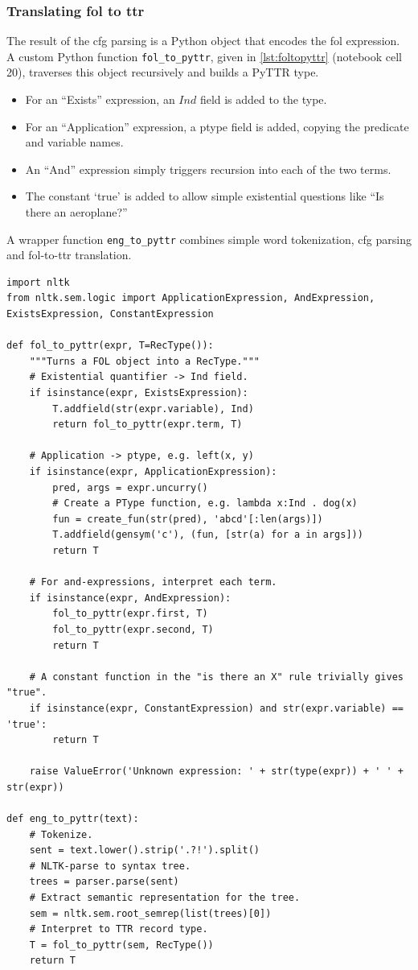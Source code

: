 \subsubsection{Translating \gls{fol} to \gls{ttr}}

The result of the \gls{cfg} parsing is a Python object that encodes the \gls{fol} expression.
A custom Python function \texttt{fol\_to\_pyttr}, given in \autoref{lst:foltopyttr} (notebook cell 20), traverses this object recursively and builds a PyTTR type.

\begin{itemize}
\item For an ``Exists'' expression, an $Ind$ field is added to the type.
\item For an ``Application'' expression, a ptype field is added, copying the predicate and variable names.
\item An ``And'' expression simply triggers recursion into each of the two terms.
\item The constant `true' is added to allow simple existential questions like ``Is there an aeroplane?''
\end{itemize}

A wrapper function \texttt{eng\_to\_pyttr} combines simple word tokenization, \gls{cfg} parsing and \gls{fol}-to-\gls{ttr} translation.

\begin{lstlisting}[label=lst:foltopyttr, caption=Translation from \gls{fol} to \gls{ttr}.]
import nltk
from nltk.sem.logic import ApplicationExpression, AndExpression, ExistsExpression, ConstantExpression

def fol_to_pyttr(expr, T=RecType()):
    """Turns a FOL object into a RecType."""
    # Existential quantifier -> Ind field.
    if isinstance(expr, ExistsExpression):
        T.addfield(str(expr.variable), Ind)
        return fol_to_pyttr(expr.term, T)
    
    # Application -> ptype, e.g. left(x, y)
    if isinstance(expr, ApplicationExpression):
        pred, args = expr.uncurry()
        # Create a PType function, e.g. lambda x:Ind . dog(x)
        fun = create_fun(str(pred), 'abcd'[:len(args)])
        T.addfield(gensym('c'), (fun, [str(a) for a in args]))
        return T
    
    # For and-expressions, interpret each term.
    if isinstance(expr, AndExpression):
        fol_to_pyttr(expr.first, T)
        fol_to_pyttr(expr.second, T)
        return T
    
    # A constant function in the "is there an X" rule trivially gives "true".
    if isinstance(expr, ConstantExpression) and str(expr.variable) == 'true':
        return T
    
    raise ValueError('Unknown expression: ' + str(type(expr)) + ' ' + str(expr))

def eng_to_pyttr(text):
    # Tokenize.
    sent = text.lower().strip('.?!').split()
    # NLTK-parse to syntax tree.
    trees = parser.parse(sent)
    # Extract semantic representation for the tree.
    sem = nltk.sem.root_semrep(list(trees)[0])
    # Interpret to TTR record type.
    T = fol_to_pyttr(sem, RecType())
    return T
\end{lstlisting}



